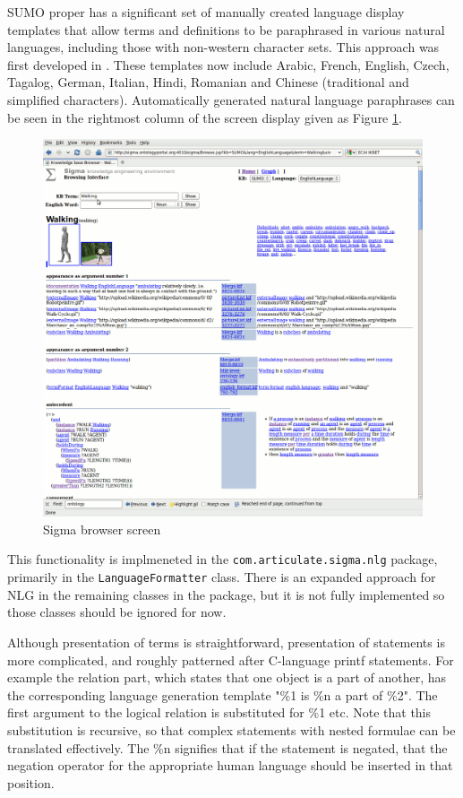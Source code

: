 \documentclass{book}
\begin{document}
SUMO proper has a significant set of manually created language display templates
that allow terms and definitions to be paraphrased in various natural languages,
including those with non-western character sets.  This approach was first
developed in \cite{DBLP:conf/kes/Sevcenko03}. These templates now include
Arabic, French, English, Czech, Tagalog, German, Italian, Hindi, Romanian and
Chinese (traditional and simplified characters). Automatically generated natural
language paraphrases can be seen in the rightmost column of the screen display
given as Figure \ref{fig:SigmaScreen}.

\begin{figure}
  \centering
  \includegraphics[width=4.5in]{pictures/SigmaScreen.png}
  \caption{Sigma browser screen}
  \label{fig:SigmaScreen}
\end{figure}

This functionality is implmeneted in the \texttt{com.articulate.sigma.nlg}
package, primarily in the \texttt{LanguageFormatter} class.  There is an
expanded approach for NLG in the remaining classes in the package, but it is
not fully implemented so those classes should be ignored for now.

Although presentation of terms is straightforward, presentation of statements is
more complicated, and roughly patterned after C-language printf
statements. For example the relation part, which states that one object is a
part of another, has the corresponding language generation template "\%1 is \%n
a part of \%2". The first argument to the logical relation is substituted for
\%1 etc. Note that this substitution is recursive, so that complex statements
with nested formulae can be translated effectively. The \%n signifies that if
the statement is negated, that the negation operator for the appropriate human
language should be inserted in that position.
\end{document}
